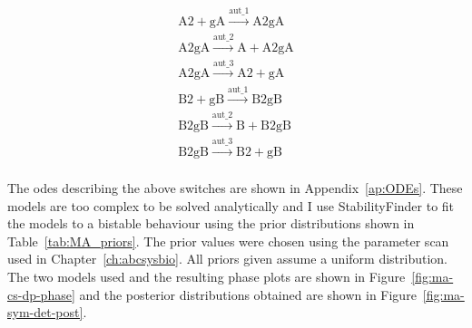 $$
\begin{array}{cccc} 
    \textrm{A2} + \textrm{gA} \stackrel{\textrm{aut\_1}}{\longrightarrow} \textrm{A2gA} \\
    \textrm{A2gA} \stackrel{\textrm{aut\_2}}{\longrightarrow} \textrm{A} + \textrm{A2gA}\\
    \textrm{A2gA} \stackrel{\textrm{aut\_3}}{\longrightarrow} \textrm{A2}+ \textrm{gA}  \\
    \textrm{B2} + \textrm{gB} \stackrel{\textrm{aut\_1}}{\longrightarrow} \textrm{B2gB} \\
    \textrm{B2gB} \stackrel{\textrm{aut\_2}}{\longrightarrow} \textrm{B} + \textrm{B2gB}\\
    \textrm{B2gB} \stackrel{\textrm{aut\_3}}{\longrightarrow} \textrm{B2}+ \textrm{gB}  \\
\end{array}
$$

\noindent The \acrshort{ode}s describing the above switches are shown in Appendix~\ref{ap:ODEs}. These models are too complex to be solved analytically and I use StabilityFinder to fit the models to a bistable behaviour using the prior distributions shown in Table~\ref{tab:MA_priors}. The prior values were chosen using the parameter scan used in Chapter~\ref{ch:abcsysbio}. All priors given assume a uniform distribution. The two models used and the resulting phase plots are shown in Figure~\ref{fig:ma-cs-dp-phase} and the posterior distributions obtained are shown in Figure~\ref{fig:ma-sym-det-post}. 


